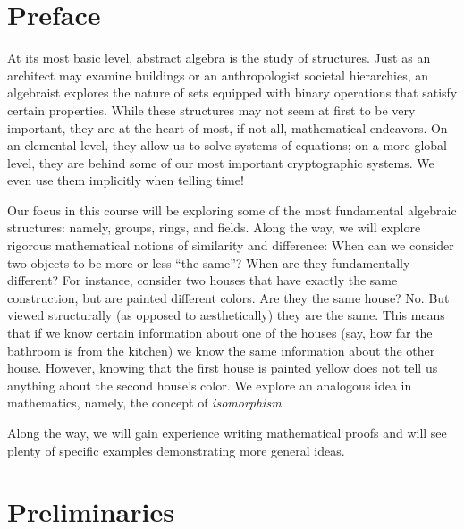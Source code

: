 \documentclass[10pt,]{book}
\theoremstyle{plain}
\theoremstyle{definition}
\theoremstyle{definition}
\theoremstyle{definition}
\theoremstyle{definition}
\numberwithin{equation}{section}
\begin{document}
\chapter*{Preface}\label{preface-1}

    At its most basic level, abstract algebra is the study of structures. Just as an architect may examine buildings or an anthropologist societal hierarchies, an algebraist explores the nature of sets equipped with binary operations that satisfy certain properties. While these structures may not seem at first to be very important, they are at the heart of most, if not all, mathematical endeavors. On an elemental level, they allow us to solve systems of equations; on a more global-level, they are behind some of our most important cryptographic systems. We even use them implicitly when telling time!
\par

    Our focus in this course will be exploring some of the most fundamental algebraic structures: namely, groups, rings, and fields. Along the way, we will explore rigorous mathematical notions of similarity and difference: When can we consider two objects to be more or less ``the same''? When are they fundamentally different? For instance, consider two houses that have exactly the same construction, but are painted different colors. Are they the same house? No. But viewed structurally (as opposed to aesthetically) they are the same. This means that if we know certain information about one of the houses (say, how far the bathroom is from the kitchen) we know the same information about the other house. However, knowing that the first house is painted yellow does not tell us anything about the second house's color. We explore an analogous idea in mathematics, namely, the concept of \emph{isomorphism}.
\par

    Along the way, we will gain experience writing mathematical proofs and will see plenty of specific examples demonstrating more general ideas.
\setcounter{tocdepth}{1}
\renewcommand*\contentsname{Contents}
\tableofcontents
\mainmatter
\typeout{************************************************}
\typeout{************************************************}
\chapter[{Preliminaries}]{Preliminaries}\label{pre}
\typeout{************************************************}
\typeout{************************************************}
\end{document}

